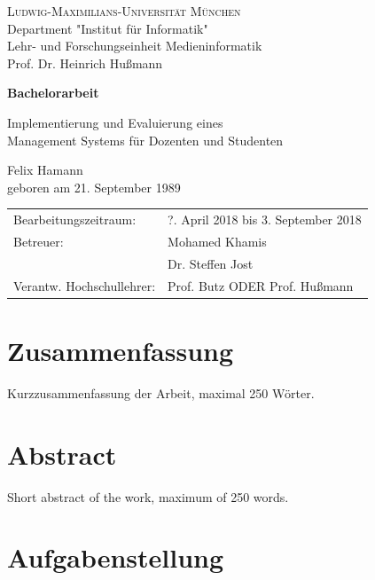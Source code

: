 \documentclass[11pt,a4paper,twoside,ngerman]{article}
\begin{document}
\pagestyle{empty} %

\begin{center}
\textsc{Ludwig-Maximilians-Universität München}\\
Department "Institut für Informatik"\\
Lehr- und Forschungseinheit Medieninformatik\\
Prof. Dr. Heinrich Hußmann

\vspace{5cm}
{\large\textbf{Bachelorarbeit}}\vspace{.5cm}

{\LARGE Implementierung und Evaluierung eines \\Management Systems für Dozenten und Studenten}
\vspace{1cm}

{\large Felix Hamann}\\
geboren am 21. September 1989

\end{center}
\vfill

\begin{tabular}{ll}
Bearbeitungszeitraum: & ?. April 2018 bis 3. September 2018\\
Betreuer: & Mohamed Khamis\\
& Dr. Steffen Jost\\
Verantw. Hochschullehrer: & Prof. Butz ODER Prof. Hußmann
\end{tabular}


\clearpage
\section*{Zusammenfassung}

Kurzzusammenfassung der Arbeit, maximal 250 Wörter.

\section*{Abstract}

Short abstract of the work, maximum of 250 words.

\clearpage
\section*{Aufgabenstellung}
\end{document}
